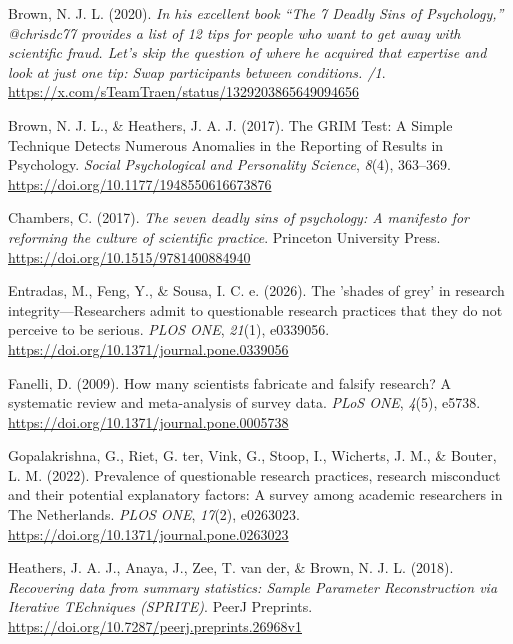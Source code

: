 \documentclass[
  nonatbib,
  authoryear,
  preprint]{elsarticle}
\newlength{\cslhangindent}
\newenvironment{CSLReferences}[2] %
 {\begin{list}{}{%
  \setlength{\itemindent}{0pt}
  \setlength{\leftmargin}{0pt}
  \setlength{\parsep}{0pt}
  \ifodd #1
   \setlength{\leftmargin}{\cslhangindent}
   \setlength{\itemindent}{-1\cslhangindent}
  \fi
  \setlength{\itemsep}{#2\baselineskip}}}
 {\end{list}}
\begin{document}
\label{refs}
\begin{CSLReferences}{1}{0}
Brown, N. J. L. (2020). \emph{{In his excellent book {``The 7 Deadly
Sins of Psychology,''} @chrisdc77 provides a list of 12 tips for people
who want to get away with scientific fraud. Let's skip the question of
where he acquired that expertise and look at just one tip: Swap
participants between conditions. /1}}.
\url{https://x.com/sTeamTraen/status/1329203865649094656}

Brown, N. J. L., \& Heathers, J. A. J. (2017). The {GRIM} {Test}: {A}
{Simple} {Technique} {Detects} {Numerous} {Anomalies} in the {Reporting}
of {Results} in {Psychology}. \emph{Social Psychological and Personality
Science}, \emph{8}(4), 363--369.
\url{https://doi.org/10.1177/1948550616673876}

Chambers, C. (2017). \emph{The seven deadly sins of psychology: {A}
manifesto for reforming the culture of scientific practice}. Princeton
University Press. \url{https://doi.org/10.1515/9781400884940}

Entradas, M., Feng, Y., \& Sousa, I. C. e. (2026). The '{shades} of
grey' in research integrity---{Researchers} admit to questionable
research practices that they do not perceive to be serious. \emph{PLOS
ONE}, \emph{21}(1), e0339056.
\url{https://doi.org/10.1371/journal.pone.0339056}

Fanelli, D. (2009). How many scientists fabricate and falsify research?
{A} systematic review and meta-analysis of survey data. \emph{PLoS ONE},
\emph{4}(5), e5738. \url{https://doi.org/10.1371/journal.pone.0005738}

Gopalakrishna, G., Riet, G. ter, Vink, G., Stoop, I., Wicherts, J. M.,
\& Bouter, L. M. (2022). Prevalence of questionable research practices,
research misconduct and their potential explanatory factors: {A} survey
among academic researchers in {The} {Netherlands}. \emph{PLOS ONE},
\emph{17}(2), e0263023.
\url{https://doi.org/10.1371/journal.pone.0263023}

Heathers, J. A. J., Anaya, J., Zee, T. van der, \& Brown, N. J. L.
(2018). \emph{Recovering data from summary statistics: {Sample}
{Parameter} {Reconstruction} via {Iterative} {TEchniques} ({SPRITE})}.
PeerJ Preprints. \url{https://doi.org/10.7287/peerj.preprints.26968v1}


\end{CSLReferences}
\end{document}
